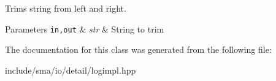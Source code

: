 Trims string from left and right. 


\begin{DoxyParams}[1]{Parameters}
\mbox{\tt in,out}  & {\em str} & String to trim \\
\hline
\end{DoxyParams}


The documentation for this class was generated from the following file\-:\begin{DoxyCompactItemize}
\item 
include/sma/io/detail/logimpl.\-hpp\end{DoxyCompactItemize}
